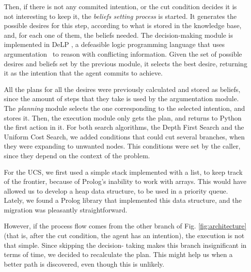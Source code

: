     Then, if there is not any commited intention, or the cut condition decides
    it is not interesting to keep it, the \textit{beliefs setting process} is
    started. It generates the possible desires for this step, according to what
    is stored in the knowledge base, and, for each one of them, the beliefs
    needed.  The decision-making module is implemented in
    DeLP\cite{Rotstein:2007} \cite{Ferretti:2008}, a defeasible logic
    programming language that uses argumentation \cite{DBLP:conf/comma/2008}\ to
    reason with conflicting information.  Given the set of possible desires and
    beliefs set by the previous module, it selects the best desire, returning it
    as the intention that the agent commits to achieve.

    All the plans for all the desires were previously calculated and stored as 
    beliefs, since the amount of steps that they take is used by the 
    argumentation module. The \textit{planning} module selects the one 
    corresponding to the selected intention, and stores it. Then, the 
    execution module only gets the plan, and returns to Python the first 
    action in it.
    For both search algorithms, the Depth First Search and the Uniform Cost 
    Search, we added conditions that could cut several branches, when they were 
    expanding to unwanted nodes. This conditions were set by the caller, since 
    they depend on the context of the problem.

    For the UCS, we first used a simple stack implemented with a list, to keep 
    track of the frontier, because of Prolog's inability to work with arrays. This 
    would have allowed us to develop a heap data structure, to be used in a 
    priority queue. Lately, we found a Prolog library that implemented this data 
    structure, and the migration was pleasantly straightforward.

    However, if the process flow comes from the other branch of Fig. 
    \ref{fig:architecture} (that is, after the cut condition, the agent has an 
    intention), the execution is not that simple. Since skipping the decision-
    taking makes this branch insignificant in terms of time, we decided to 
    recalculate the plan. This might help us when a better path is discovered, 
    even though this is unlikely.

